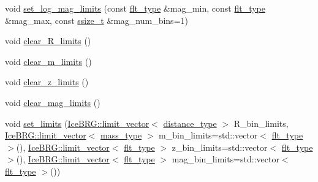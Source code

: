 \begin{DoxyCompactItemize}
\item 
void \hyperlink{classIceBRG_1_1pair__bins__summary_a0b2a787e58824b62ceb8c1885fbacac9}{set\+\_\+log\+\_\+mag\+\_\+limits} (const \hyperlink{lib_2IceBRG__main_2common_8h_ad0f130a56eeb944d9ef2692ee881ecc4}{flt\+\_\+type} \&mag\+\_\+min, const \hyperlink{lib_2IceBRG__main_2common_8h_ad0f130a56eeb944d9ef2692ee881ecc4}{flt\+\_\+type} \&mag\+\_\+max, const \hyperlink{lib_2IceBRG__main_2common_8h_ab322a3e50421dc5f0c43316b1b373592}{ssize\+\_\+t} \&mag\+\_\+num\+\_\+bins=1)
\item 
void \hyperlink{classIceBRG_1_1pair__bins__summary_aa7c0b185041754b838ad5708d19d20a9}{clear\+\_\+\+R\+\_\+limits} ()
\item 
void \hyperlink{classIceBRG_1_1pair__bins__summary_a08a19acd04c4b447212b9b6e2d9d2fd1}{clear\+\_\+m\+\_\+limits} ()
\item 
void \hyperlink{classIceBRG_1_1pair__bins__summary_a4b81ecfc23d7511f156bb0618af79745}{clear\+\_\+z\+\_\+limits} ()
\item 
void \hyperlink{classIceBRG_1_1pair__bins__summary_a365a1e2bdd23df20d79212ad824ae289}{clear\+\_\+mag\+\_\+limits} ()
\item 
void \hyperlink{classIceBRG_1_1pair__bins__summary_a956cd9635846601f12fca9fd66aea3db}{set\+\_\+limits} (\hyperlink{classIceBRG_1_1limit__vector}{Ice\+B\+R\+G\+::limit\+\_\+vector}$<$ \hyperlink{namespaceIceBRG_a45499647eb87e24c10ab32c628711cec}{distance\+\_\+type} $>$ R\+\_\+bin\+\_\+limits, \hyperlink{classIceBRG_1_1limit__vector}{Ice\+B\+R\+G\+::limit\+\_\+vector}$<$ \hyperlink{namespaceIceBRG_a1be72ac4918a9b029f2eefa084213e35}{mass\+\_\+type} $>$ m\+\_\+bin\+\_\+limits=std\+::vector$<$ \hyperlink{lib_2IceBRG__main_2common_8h_ad0f130a56eeb944d9ef2692ee881ecc4}{flt\+\_\+type} $>$(), \hyperlink{classIceBRG_1_1limit__vector}{Ice\+B\+R\+G\+::limit\+\_\+vector}$<$ \hyperlink{lib_2IceBRG__main_2common_8h_ad0f130a56eeb944d9ef2692ee881ecc4}{flt\+\_\+type} $>$ z\+\_\+bin\+\_\+limits=std\+::vector$<$ \hyperlink{lib_2IceBRG__main_2common_8h_ad0f130a56eeb944d9ef2692ee881ecc4}{flt\+\_\+type} $>$(), \hyperlink{classIceBRG_1_1limit__vector}{Ice\+B\+R\+G\+::limit\+\_\+vector}$<$ \hyperlink{lib_2IceBRG__main_2common_8h_ad0f130a56eeb944d9ef2692ee881ecc4}{flt\+\_\+type} $>$ mag\+\_\+bin\+\_\+limits=std\+::vector$<$ \hyperlink{lib_2IceBRG__main_2common_8h_ad0f130a56eeb944d9ef2692ee881ecc4}{flt\+\_\+type} $>$())
\item 

\end{DoxyCompactItemize}
